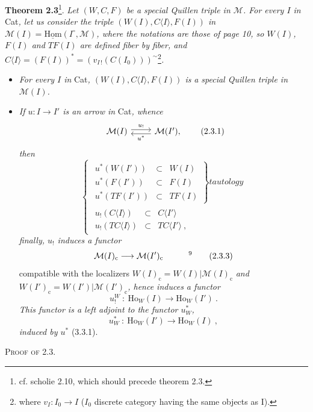 \documentclass[11pt]{article}
\newcommand{\printedpage}[1]{\marginpar{\footnotesize p.~#1}}
\newcommand{\msp}[1]{\marginpar{\footnotesize [#1]}}
\newcommand{\M}{\mathcal{M}}
\newcommand{\Ho}{\mathrm{Ho}}
\newcommand{\cc}{\mathrm{c}}
\begin{document}
\textbf{Theorem 2.3}\footnote[7]{cf. scholie 2.10, which should precede theorem 2.3.}. \textit{Let $(W,C,F)$ be a special Quillen triple in $\M$. For every $I$ in} Cat\textit{, let us consider the triple $(W(I),C\langle I\rangle,F(I))$ in $\M(I) = \underline{\mathrm{Hom}}(I^{\circ},\M)$, where the notations are those of page 10, so $W(I)$, $F(I)$ and $TF(I)$ are defined fiber by fiber, and $C\langle I\rangle = (F(I))^* = (v_{I\,!}(C(I_0)))^{\sim}$}\footnote[8]{where $v_I : I_0 \longrightarrow I$ ($I_0$ discrete category having the same objects as I).}\textit{.}
\begin{itemize}
\item[1°)] \textit{For every $I$ in} Cat\textit{, $(W(I),C\langle I\rangle,F(I))$ is}
\msp{page 20}
\textit{a special Quillen triple in $\M(I)$.}
\item[2°)] \textit{If $u : I \longrightarrow I'$ is an arrow in} Cat\textit{, whence}
\[
\begin{tikzcd}
\M(I) \arrow[r, shift left, "u_!"] & \M(I'), \arrow[l, shift left, "u^*"]
\end{tikzcd}
\tag*{(2.3.1)}
\]
\textit{then}
\[
\left\{
\begin{array}{l}
\left.\begin{array}{rcl}
u^*(W(I')) & \subset & W(I)\\
u^*(F(I')) & \subset & F(I)\\
u^*(TF(I')) & \subset & TF(I)
\end{array}\right\}\textit{tautology}\\
\begin{array}{rcl}
u_!(C\langle I\rangle) & \subset & C\langle I'\rangle\\
u_!(TC\langle I\rangle) & \subset & TC\langle I'\rangle\ ,
\end{array}
\end{array}\right.
\tag*{(2.3.2)}
\]
\textit{finally, $u_!$ induces a functor}
\[
\M(I)_{\cc} \longrightarrow \M(I')_{\cc} \qquad\quad \text{\footnotemark[9]}
\tag*{(2.3.3)}
\]
compatible with the localizers $W(I)_{\cc} = W(I)|\M(I)_{\cc}$ \textit{and} $W(I')_{\cc} = W(I')|\M(I')_{\cc}$\textit{, hence induces a functor}
\[
u_!^W\ :\ \Ho_W(I) \longrightarrow \Ho_W(I')\ .
\tag*{(2.3.4)}
\]
\printedpage{13}
\textit{This functor is a left adjoint to the functor $u^*_W$,}
\[
u^*_W\ :\ \Ho_W(I') \longrightarrow \Ho_W(I)\ ,
\tag*{(2.3.5)}
\]
\textit{induced by $u^*$} (3.3.1). %
\end{itemize}
\textsc{Proof of 2.3.}
\end{document}
